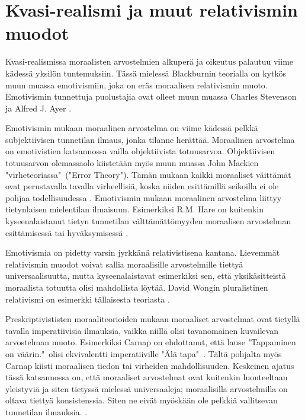 \documentclass[a4paper,12pt,times,titlepage,finnish]{article}
\begin{document}
\section{Kvasi-realismi ja muut relativismin muodot}


Kvasi-realismissa moraalisten arvostelmien alkuperä ja oikeutus palautuu viime kädessä yksilön tuntemuksiin. Tässä mielessä Blackburnin teorialla on kytkös muun muassa emotivismiin, joka on eräs moraalisen relativismin muoto. Emotivismin tunnettuja puolustajia ovat olleet muun muassa Charles Stevenson \citep{Stevenson44} ja Alfred J. Ayer \citep{Ayer36}. 

Emotivismin mukaan moraalinen arvostelma on viime kädessä pelkkä subjektiivisen tunnetilan ilmaus, jonka tilanne herättää. Moraalinen arvostelma on emotivistien katsannossa vailla objektiivista totuusarvoa. Objektiivisen totuusarvon olemassaolo kiistetään myös muun muassa John Mackien "virheteoriassa"\ ("Error Theory"). Tämän mukaan kaikki moraaliset väittämät ovat perustavalla tavalla virheellisiä, koska niiden esittämillä seikoilla ei ole pohjaa todellisuudessa \citep[ks.][]{Mackie77}. Emotivismin mukaan moraalinen arvostelma liittyy tietynlaisen mielentilan ilmaisuun. Esimerkiksi R.M. Hare on kuitenkin kyseenalaistanut tietyn tunnetilan välttämättömyyden moraalisen arvostelman esittämisessä tai hy\-väk\-sy\-mi\-ses\-sä \citep[9-11]{Hare52}. 

Emotivismia on pidetty varsin jyrkkänä relativistisena kantana. Lievemmät relativismin muodot voivat sallia moraalisille arvostelmille tiettyä universaalisuutta, mutta kyseenalaistavat esimerkiksi sen, että yksikäsitteistä moraalista totuutta olisi mahdollista löytää. David Wongin pluralistinen relativismi on esimerkki tällaisesta teoriasta \citep[ks. esim.][]{Wong84}. 

Preskriptivististen moraaliteorioiden mukaan moraaliset arvostelmat ovat tietyllä tavalla imperatiivisia ilmauksia, vaikka niillä olisi tavanomainen kuvailevan arvostelman muoto. Esimerkiksi Carnap on ehdottanut, että lause "Tappaminen on väärin."\ olisi ekvivalentti imperatiiville "Älä tapa"\ \citep[23-29]{Carnap37}. Tältä pohjalta myös Carnap kiisti moraalisen tiedon tai virheiden mahdollisuuden. 
Keskeinen ajatus tässä katsannossa on, että moraaliset arvostelmat ovat kuitenkin luonteeltaan yleistyviä ja siten tietyssä mielessä universaaleja; moraalisilla arvostelmilla on oltava tiettyä konsistenssia. Siten ne eivät myöskään ole pelkkiä vallitsevan tunnetilan ilmauksia. \citep{cognitivismSE}.
\end{document}
